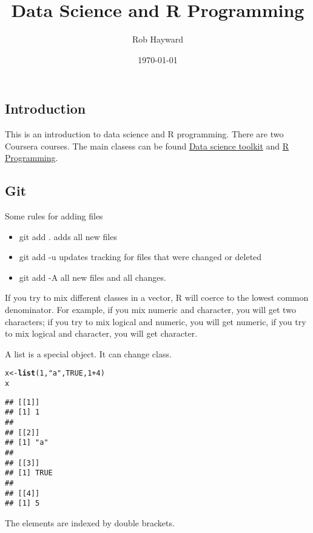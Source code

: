 \documentclass[12pt, a4paper, oneside]{article}\usepackage[]{graphicx}\usepackage[]{color}
\makeatletter
\newcommand{\hlnum}[1]{\textcolor[rgb]{0.686,0.059,0.569}{#1}}%
\newcommand{\hlstr}[1]{\textcolor[rgb]{0.192,0.494,0.8}{#1}}%
\newcommand{\hlopt}[1]{\textcolor[rgb]{0,0,0}{#1}}%
\newcommand{\hlstd}[1]{\textcolor[rgb]{0.345,0.345,0.345}{#1}}%
\newcommand{\hlkwb}[1]{\textcolor[rgb]{0.69,0.353,0.396}{#1}}%
\newcommand{\hlkwd}[1]{\textcolor[rgb]{0.737,0.353,0.396}{\textbf{#1}}}%
\newenvironment{kframe}{%
 \def\at@end@of@kframe{}%
 \ifinner\ifhmode%
  \def\at@end@of@kframe{\end{minipage}}%
  \begin{minipage}{\columnwidth}%
 \fi\fi%
 \def\FrameCommand##1{\hskip\@totalleftmargin \hskip-\fboxsep
 \colorbox{shadecolor}{##1}\hskip-\fboxsep
     \hskip-\linewidth \hskip-\@totalleftmargin \hskip\columnwidth}%
 \MakeFramed {\advance\hsize-\width
   \@totalleftmargin\z@ \linewidth\hsize
   \@setminipage}}%
 {\par\unskip\endMakeFramed%
 \at@end@of@kframe}
\newenvironment{knitrout}{}{} %
\makeatother
\begin{document}
\title{Data Science and R Programming}
\author{Rob Hayward}
\date{\today}
\maketitle
\subsection*{Introduction}

This is an introduction to data science and R programming. There are two Coursera courses.  The main clasess can be found \href{https://www.coursera.org/course/datascitoolbox}{Data science toolkit} and \href{https://class.coursera.org/rprog-004}{R Programming}.  

\subsection{Git}
Some rules for adding files
\begin{itemize}
\item git add . adds all new files
\item git add -u updates tracking for files that were changed or deleted
\item git add -A all new files and all changes.
\end{itemize}

If you try to mix different classes in a vector, R will coerce to the lowest common denominator. For example, if you mix numeric and character, you will get two characters; if you try to mix logical and numeric, you will get numeric, if you try to mix logical and character, you will get character. 

A list is a special object.  It can change class.  
\begin{knitrout}
\color{fgcolor}\begin{kframe}
\begin{alltt}
\hlstd{x} \hlkwb{<-} \hlkwd{list}\hlstd{(}\hlnum{1}\hlstd{,} \hlstr{"a"}\hlstd{,} \hlnum{TRUE}\hlstd{,} \hlnum{1} \hlopt{+} \hlnum{4}\hlstd{)}
\hlstd{x}
\end{alltt}
\begin{verbatim}
## [[1]]
## [1] 1
## 
## [[2]]
## [1] "a"
## 
## [[3]]
## [1] TRUE
## 
## [[4]]
## [1] 5
\end{verbatim}
\end{kframe}
\end{knitrout}

The elements are indexed by double brackets.  
\end{document}
